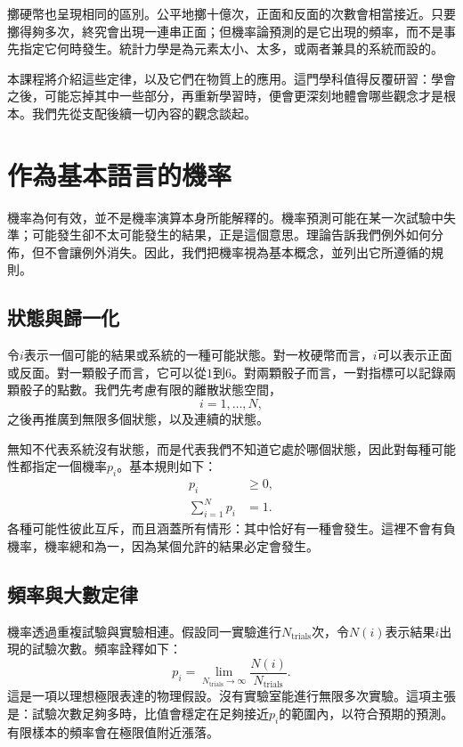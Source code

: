 擲硬幣也呈現相同的區別。公平地擲十億次，正面和反面的次數會相當接近。只要擲得夠多次，終究會出現一連串正面；但機率論預測的是它出現的頻率，而不是事先指定它何時發生。統計力學是為元素太小、太多，或兩者兼具的系統而設的。

本課程將介紹這些定律，以及它們在物質上的應用。這門學科值得反覆研習：學會之後，可能忘掉其中一些部分，再重新學習時，便會更深刻地體會哪些觀念才是根本。我們先從支配後續一切內容的觀念談起。

\section{作為基本語言的機率}

機率為何有效，並不是機率演算本身所能解釋的。機率預測可能在某一次試驗中失準；可能發生卻不太可能發生的結果，正是這個意思。理論告訴我們例外如何分佈，但不會讓例外消失。因此，我們把機率視為基本概念，並列出它所遵循的規則。

\subsection{狀態與歸一化}

令\(i\)表示一個可能的結果或系統的一種可能狀態。對一枚硬幣而言，\(i\)可以表示正面或反面。對一顆骰子而言，它可以從\(1\)到\(6\)。對兩顆骰子而言，一對指標可以記錄兩顆骰子的點數。我們先考慮有限的離散狀態空間，
\begin{equation}
 i=1,\ldots,N,
\end{equation}
之後再推廣到無限多個狀態，以及連續的狀態。

無知不代表系統沒有狀態，而是代表我們不知道它處於哪個狀態，因此對每種可能性都指定一個機率\(p_i\)。基本規則如下：
\begin{align}
 p_i &\geq 0, \label{eq:sm1-prob-positive}\\
 \sum_{i=1}^{N}p_i &=1. \label{eq:sm1-prob-normalization}
\end{align}
各種可能性彼此互斥，而且涵蓋所有情形：其中恰好有一種會發生。這裡不會有負機率，機率總和為一，因為某個允許的結果必定會發生。

\subsection{頻率與大數定律}

機率透過重複試驗與實驗相連。假設同一實驗進行\(N_{\mathrm{trials}}\)次，令\(N(i)\)表示結果\(i\)出現的試驗次數。頻率詮釋如下：
\begin{equation}
 p_i=
 \lim_{N_{\mathrm{trials}}\to\infty}
 \frac{N(i)}{N_{\mathrm{trials}}}.
 \label{eq:sm1-frequency}
\end{equation}
這是一項以理想極限表達的物理假設。沒有實驗室能進行無限多次實驗。這項主張是：試驗次數足夠多時，比值會穩定在足夠接近\(p_i\)的範圍內，以符合預期的預測。有限樣本的頻率會在極限值附近漲落。

